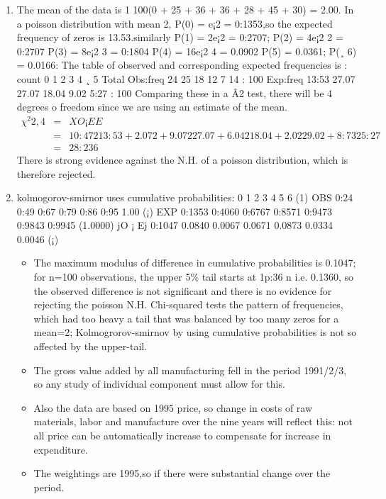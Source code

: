 \documentclass[a4paper,12pt]{article}
\begin{document}
\begin{enumerate}
    \item 
The mean of the data is 1
100(0 + 25 + 36 + 36 + 28 + 45 + 30) = 2.00. In a
poisson distribution with mean 2, P(0) = e¡2 = 0:1353,so the expected frequency of
zeros is 13.53.similarly P(1) = 2e¡2 = 0:2707; P(2) = 4e¡2
2 = 0:2707 P(3) = 8e¡2
3 =
0:1804 P(4) = 16e¡2
4 = 0.0902 P(5) = 0.0361; P(¸ 6) = 0.0166: The table of observed
and corresponding expected frequencies is :
count 0 1 2 3 4 ¸ 5 Total
Obs:freq 24 25 18 12 7 14 : 100
Exp:freq 13:53 27.07 27.07 18.04 9.02 5:27 : 100
Comparing these in a Â2 test, there will be 4 degrees o freedom since we are using an
estimate of the mean.
\begin{eqnarray*}
\chi^2{2,4}
&=&
XO ¡ E
E
\\ &=& 
10:472
13:53
+
2.072 + 9.072
27.07
+
6.042
18.04
+
2.022
9.02
+
8:732
5:27
\\ &=& 28:236
\end{eqnarray*}
There is strong evidence against the N.H. of a poisson distribution, which is therefore
rejected.
\item kolmogorov-smirnor uses cumulative probabilities:
0 1 2 3 4 5 6 (1)
OBS 0:24 0:49 0:67 0:79 0:86 0:95 1.00 (¡)
EXP 0:1353 0:4060 0:6767 0:8571 0:9473 0:9843 0:9945 (1.0000)
jO ¡ Ej 0:1047 0.0840 0.0067 0.0671 0.0873 0.0334 0.0046 (¡)
\begin{itemize}
    \item The maximum modulus of difference in cumulative probabilities is 0.1047; for n=100
observations, the upper 5\% tail starts at 1p:36
n i.e. 0.1360, so the observed difference is
not significant and there is no evidence for rejecting the poisson N.H. Chi-squared tests
the pattern of frequencies, which had too heavy a tail that was balanced by too many
zeros for a mean=2; Kolmogrorov-smirnov by using cumulative probabilities is not so
affected by the upper-tail.
\item The gross value added by all manufacturing fell in the period 1991/2/3, so any study
of individual component must allow for this. 
\item Also the data are based on 1995 price, so
change in costs of raw materials, labor and manufacture over the nine years will reflect
this: not all price can be automatically increase to compensate for increase in expenditure.
\item The weightings are 1995,so if there were substantial change over the period.

\end{itemize}
\end{enumerate}
\end{document}
